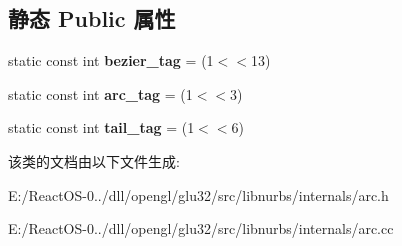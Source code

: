 \subsection*{静态 Public 属性}
\begin{DoxyCompactItemize}
\item 
\mbox{\label{class_arc_a76a13d0abdaa86dffad0000916ac57b0}} 
static const int {\bfseries bezier\+\_\+tag} = (1$<$$<$13)
\item 
\mbox{\label{class_arc_a2bd4a351df2ca183495de708dbc05ce0}} 
static const int {\bfseries arc\+\_\+tag} = (1$<$$<$3)
\item 
\mbox{\label{class_arc_a7696082a96e51cf56cd720b36f258616}} 
static const int {\bfseries tail\+\_\+tag} = (1$<$$<$6)
\end{DoxyCompactItemize}


该类的文档由以下文件生成\+:\begin{DoxyCompactItemize}
\item 
E\+:/\+React\+O\+S-\/0../dll/opengl/glu32/src/libnurbs/internals/arc.\+h\item 
E\+:/\+React\+O\+S-\/0../dll/opengl/glu32/src/libnurbs/internals/arc.\+cc\end{DoxyCompactItemize}
